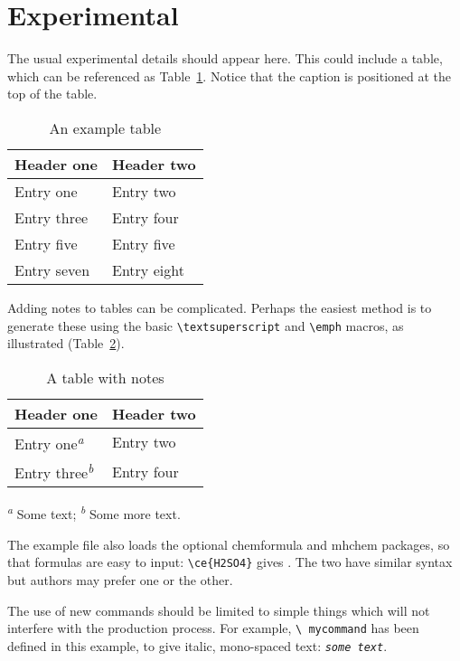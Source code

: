 \documentclass[letterpaper]{article}
\newcommand*\mycommand[1]{\texttt{\emph{#1}}}
\begin{document}
\section{Experimental}

The usual experimental details should appear here. This could include a table,
which can be referenced as Table~\ref{tbl:example}. Notice that the caption is
positioned at the top of the table.
\begin{table}
  \caption{An example table}
  \label{tbl:example}
  \centering
  \begin{tabular}{ll}
    \hline
    Header one  & Header two  \\
    \hline
    Entry one   & Entry two   \\
    Entry three & Entry four  \\
    Entry five  & Entry five  \\
    Entry seven & Entry eight \\
    \hline
  \end{tabular}
\end{table}

Adding notes to tables can be complicated. Perhaps the easiest method is to
generate these using the basic \texttt{\textbackslash textsuperscript} and
\texttt{\textbackslash emph} macros, as illustrated (Table~\ref{tbl:notes}).
\begin{table}
  \caption{A table with notes}
  \label{tbl:notes}
  \centering
  \begin{tabular}{ll}
    \hline
    Header one                            & Header two \\
    \hline
    Entry one\textsuperscript{\emph{a}}   & Entry two  \\
    Entry three\textsuperscript{\emph{b}} & Entry four \\
    \hline
  \end{tabular}

  \textsuperscript{\emph{a}} Some text;
  \textsuperscript{\emph{b}} Some more text.
\end{table}

The example file also loads the optional \textsf{chemformula} and
\textsf{mhchem} packages, so that formulas are easy to input:
\texttt{\textbackslash ce\{H2SO4\}} gives . The two have similar
syntax but authors may prefer one or the other.

The use of new commands should be limited to simple things which will not
interfere with the production process. For example, \texttt{\textbackslash
mycommand} has been defined in this example, to give italic, mono-spaced text:
\mycommand{some text}.
\end{document}
